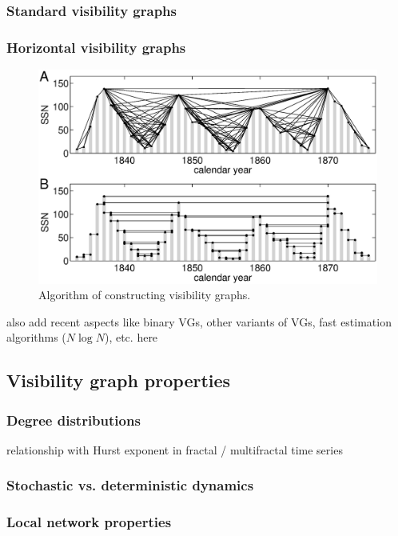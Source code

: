 		\subsubsection{Standard visibility graphs}
		\subsubsection{Horizontal visibility graphs}
			\begin{figure}
			  \centering
			  \includegraphics[width=\columnwidth]{Chapter04_VisibilityGt/TSspotnumberYear.eps}
			  \caption{Algorithm of constructing visibility graphs. \label{fig_chap04:timeseriesSS}}
			\end{figure}

also add recent aspects like binary VGs, other variants of VGs, fast estimation algorithms ($N\log N$), etc. here

	\subsection{Visibility graph properties}
		\subsubsection{Degree distributions}
		relationship with Hurst exponent in fractal / multifractal time series
		\subsubsection{Stochastic vs. deterministic dynamics}
		\subsubsection{Local network properties}
